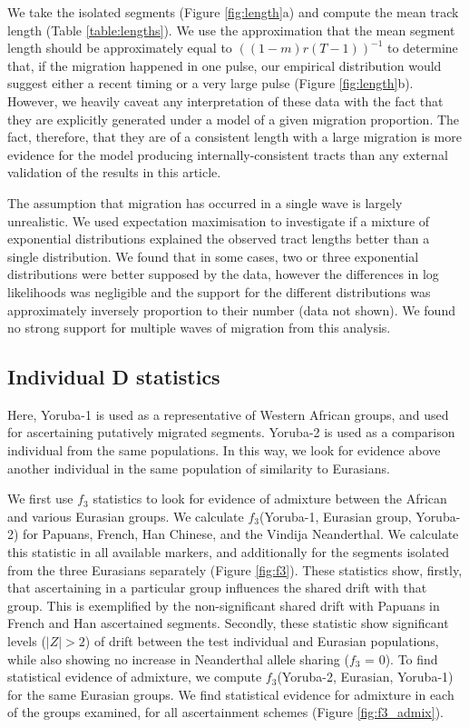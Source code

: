 \documentclass{article}
\begin{document}
We take the isolated segments (Figure \ref{fig:length}a) and compute the mean track length (Table \ref{table:lengths}). We use the approximation that the mean segment length should be approximately equal to $((1-m)r(T-1))^{-1}$ to determine that, if the migration happened in one pulse, our empirical distribution would suggest either a recent timing or a very large pulse (Figure \ref{fig:length}b). However, we heavily caveat any interpretation of these data with the fact that they are explicitly generated under a model of a given migration proportion. The fact, therefore, that they are of a consistent length with a large migration is more evidence for the model producing internally-consistent tracts than any external validation of the results in this article. 

The assumption that migration has occurred in a single wave is largely unrealistic. We used expectation maximisation to investigate if a mixture of exponential distributions explained the observed tract lengths better than a single distribution. We found that in some cases, two or three exponential distributions were better supposed by the data, however the differences in log likelihoods was negligible and the support for the different distributions was approximately inversely proportion to their number (data not shown). We found no strong support for multiple waves of migration from this analysis.

\subsection{Individual D statistics}

Here, Yoruba-1 is used as a representative of Western African groups, and used for ascertaining putatively migrated segments. Yoruba-2 is used as a comparison individual from the same populations. In this way, we look for evidence above another individual in the same population of similarity to Eurasians.

We first use $f_3$ statistics to look for evidence of admixture between the African and various Eurasian groups. We calculate $f_3$(Yoruba-1, Eurasian group, Yoruba-2) for Papuans, French, Han Chinese, and the Vindija Neanderthal. We calculate this statistic in all available markers, and additionally for the segments isolated from the three Eurasians separately (Figure \ref{fig:f3}). These statistics show, firstly, that ascertaining in a particular group influences the shared drift with that group. This is exemplified by the non-significant shared drift with Papuans in French and Han ascertained segments. Secondly, these statistic show significant levels ($|Z|>2$) of drift between the test individual and Eurasian populations, while also showing no increase in Neanderthal allele sharing ($f_3$ = 0). To find statistical evidence of admixture, we compute $f_3$(Yoruba-2, Eurasian, Yoruba-1) for the same Eurasian groups. We find statistical evidence for admixture in each of the groups examined, for all ascertainment schemes (Figure \ref{fig:f3_admix}). 
\end{document}
